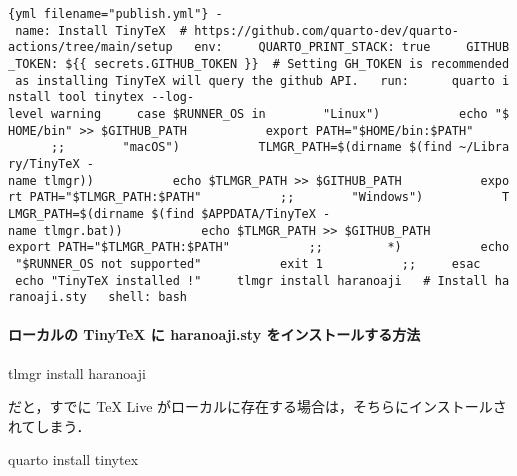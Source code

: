 \documentclass[
]{ltjsarticle}
\newenvironment{Shaded}{\begin{snugshade}}{\end{snugshade}}
\newcommand{\ExtensionTok}[1]{\textcolor[rgb]{0.00,0.23,0.31}{#1}}
\newcommand{\NormalTok}[1]{\textcolor[rgb]{0.00,0.23,0.31}{#1}}
\begin{document}
\texttt{\{yml\ filename="publish.yml"\}\ -\ name:\ \textquotesingle{}Install\ TinyTeX\textquotesingle{}\ \ \#\ https://github.com/quarto-dev/quarto-actions/tree/main/setup\ \ \ env:\ \ \ \ \ QUARTO\_PRINT\_STACK:\ true\ \ \ \ \ GITHUB\_TOKEN:\ \$\{\{\ secrets.GITHUB\_TOKEN\ \}\}\ \ \#\ Setting\ GH\_TOKEN\ is\ recommended\ as\ installing\ TinyTeX\ will\ query\ the\ github\ API.\ \ \ run:\ \textbar{}\ \ \ \ \ quarto\ install\ tool\ tinytex\ -\/-log-level\ warning\ \ \ \ \ case\ \$RUNNER\_OS\ in\ \ \ \ \ \ \ \ "Linux")\ \ \ \ \ \ \ \ \ \ \ echo\ "\$HOME/bin"\ \textgreater{}\textgreater{}\ \$GITHUB\_PATH\ \ \ \ \ \ \ \ \ \ \ export\ PATH="\$HOME/bin:\$PATH"\ \ \ \ \ \ \ \ \ \ \ ;;\ \ \ \ \ \ \ \ "macOS")\ \ \ \ \ \ \ \ \ \ \ TLMGR\_PATH=\$(dirname\ \$(find\ \textasciitilde{}/Library/TinyTeX\ -name\ tlmgr))\ \ \ \ \ \ \ \ \ \ \ echo\ \$TLMGR\_PATH\ \textgreater{}\textgreater{}\ \$GITHUB\_PATH\ \ \ \ \ \ \ \ \ \ \ export\ PATH="\$TLMGR\_PATH:\$PATH"\ \ \ \ \ \ \ \ \ \ \ ;;\ \ \ \ \ \ \ \ "Windows")\ \ \ \ \ \ \ \ \ \ \ TLMGR\_PATH=\$(dirname\ \$(find\ \$APPDATA/TinyTeX\ -name\ tlmgr.bat))\ \ \ \ \ \ \ \ \ \ \ echo\ \$TLMGR\_PATH\ \textgreater{}\textgreater{}\ \$GITHUB\_PATH\ \ \ \ \ \ \ \ \ \ \ export\ PATH="\$TLMGR\_PATH:\$PATH"\ \ \ \ \ \ \ \ \ \ \ ;;\ \ \ \ \ \ \ \ \ *)\ \ \ \ \ \ \ \ \ \ \ echo\ "\$RUNNER\_OS\ not\ supported"\ \ \ \ \ \ \ \ \ \ \ exit\ 1\ \ \ \ \ \ \ \ \ \ \ ;;\ \ \ \ \ esac\ \ \ \ \ echo\ "TinyTeX\ installed\ !"\ \ \ \ \ tlmgr\ install\ haranoaji\ \ \ \#\ Install\ haranoaji.sty\ \ \ shell:\ bash}

\paragraph{ローカルの TinyTeX に haranoaji.sty
をインストールする方法}\label{ux30edux30fcux30abux30ebux306e-tinytex-ux306b-haranoaji.sty-ux3092ux30a4ux30f3ux30b9ux30c8ux30fcux30ebux3059ux308bux65b9ux6cd5}

\begin{Shaded}
\begin{Highlighting}[]
\ExtensionTok{tlmgr}\NormalTok{ install haranoaji}
\end{Highlighting}
\end{Shaded}

だと，すでに TeX Live
がローカルに存在する場合は，そちらにインストールされてしまう．

\begin{Shaded}
\begin{Highlighting}[]
\ExtensionTok{quarto}\NormalTok{ install tinytex}
\end{Highlighting}
\end{Shaded}
\end{document}
